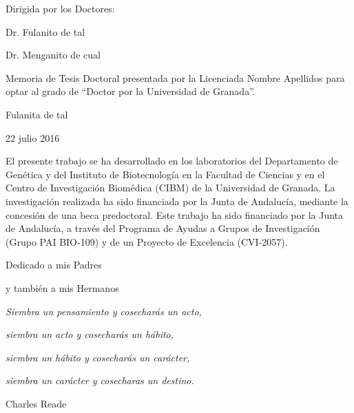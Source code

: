 \documentclass[b5paper,twoside,10pt]{book}
\newcommand{\fecha}{22 julio 2016}
\begin{document}
\begin{minipage}[t]{.4\textwidth}
Dirigida por los Doctores:

\vspace{15ex}

Dr. Fulanito de tal

\vspace{15ex}

Dr. Menganito de cual

\end{minipage}
\hfill
\begin{minipage}[t]{.5\textwidth}
Memoria de Tesis Doctoral presentada por la Licenciada Nombre Apellidos  para optar al grado de ``Doctor por la Universidad de Granada''.

\vspace{29.7ex}

\centering 
Fulanita de tal

\fecha

\end{minipage}


\cleardoublepage
\thispagestyle{empty}

\null{}
El presente trabajo se ha desarrollado en los laboratorios del Departamento de Gen\'etica y del Instituto de Biotecnolog\'ia en la Facultad de Ciencias y en el Centro de Investigaci\'on Biom\'edica (CIBM) de la Universidad de Granada. La investigaci\'on realizada ha sido financiada por la Junta de Andalucía, mediante la concesi\'on de una beca predoctoral. Este trabajo ha sido financiado por la Junta de Andalucía, a través del Programa de Ayudas a Grupos de Investigación (Grupo PAI BIO-109) y de un Proyecto de Excelencia (CVI-2057).
 
\cleardoublepage

\cleardoublepage
\null{}
\begin{flushright}
 Dedicado a mis Padres 

y también a mis Hermanos
\end{flushright}
\cleardoublepage




\null{}
{
\hfill \begin{minipage}{8cm}
\textsl{Siembra un pensamiento y cosecharás un acto,}

\textsl{siembra un acto y cosecharás un hábito,}

\textsl{siembra un hábito y cosecharás un carácter,}

\textsl{siembra un carácter y cosecharas un destino. }

\begin{flushright}
Charles Reade  
\end{flushright}

\end{minipage}
}
\cleardoublepage
\end{document}
